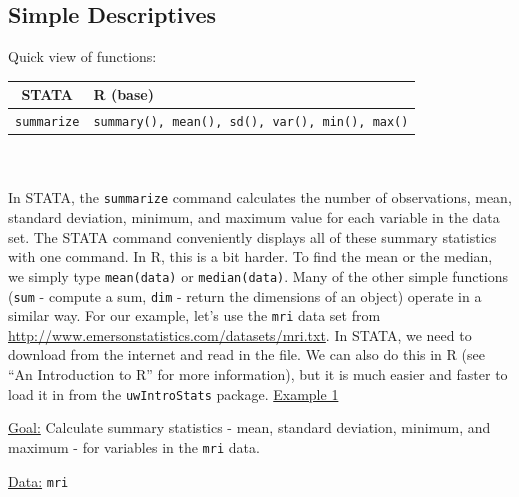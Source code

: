 \documentclass[landscape]{article}
\begin{document}
\subsection{Simple Descriptives}
Quick view of functions:\\
\begin{tabular}{c|l}
STATA & R (base) \\
\hline
\texttt{summarize} & \texttt{summary(), mean(), sd(), var(), min(), max()} 
\end{tabular}\\
\\
In STATA, the \texttt{summarize} command calculates the number of observations, mean, standard deviation, minimum, and maximum value for each variable in the data set. The STATA command conveniently displays all of these summary statistics with one command. In R, this is a bit harder. To find the mean or the median, we simply type \texttt{mean(data)} or \texttt{median(data)}. Many of the other simple functions (\texttt{sum} - compute a sum, \texttt{dim} - return the dimensions of an object) operate in a similar way. For our example, let's use the \texttt{mri} data set from \url{http://www.emersonstatistics.com/datasets/mri.txt}. In STATA, we need to download from the internet and read in the file. We can also do this in R (see ``An Introduction to R'' for more information), but it is much easier and faster to load it in from the \texttt{uwIntroStats} package.
\newline
\noindent \underline{Example 1}

\underline{Goal:} Calculate summary statistics - mean, standard deviation, minimum, and maximum - for variables in the \texttt{mri} data.

\underline{Data:} \texttt{mri}
\end{document}
